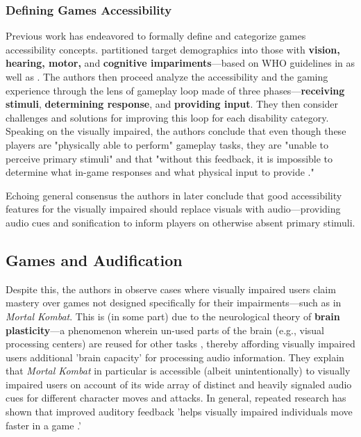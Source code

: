 \documentclass{report}
\newcommand{\tech}[1]{\textbf{#1}}
\begin{document}
\subsubsection{Defining Games Accessibility}
Previous work has endeavored to formally define and categorize games accessibility concepts. \cite{yuan2011game} partitioned target demographics into those with \tech{vision, hearing, motor,} and \tech{cognitive impariments}---based on WHO guidelines in \cite{world1980international} as well as \cite{accessguidelines}. The authors then proceed analyze the accessibility and the gaming experience through the lens of gameplay loop made of three phases---\tech{receiving stimuli}, \tech{determining response}, and \tech{providing input}. They then consider challenges and solutions for improving this loop for each disability category. Speaking on the visually impaired, the authors conclude that even though these players are "physically able to perform" gameplay tasks, they are "unable to perceive primary stimuli" and that "without this feedback, it is impossible to determine what in-game responses and what physical input to provide \cite{yuan2011game}." 

Echoing general consensus the authors in \cite{yuan2011game} later conclude that good accessibility features for the visually impaired should replace visuals with audio---providing audio cues and sonification to inform players on otherwise absent primary stimuli.

\subsection{Games and Audification}
Despite this, the authors in \cite{prazaru2020overview} observe cases where visually impaired users claim mastery over games not designed specifically for their impairments---such as in \emph{Mortal Kombat}. This is (in some part) due to the neurological theory of \tech{brain plasticity}---a phenomenon wherein un-used parts of the brain (e.g., visual processing centers) are reused for other tasks \cite{nudo2006plasticity}, thereby affording visually impaired users additional 'brain capacity' for processing audio information. They explain that \emph{Mortal Kombat} in particular is accessible (albeit unintentionally) to visually impaired users on account of its wide array of distinct and heavily signaled audio cues for different character moves and attacks. In general, repeated research has shown that improved auditory feedback 'helps visually impaired individuals move faster in a game \cite{agrimi2024game}.'
\end{document}
